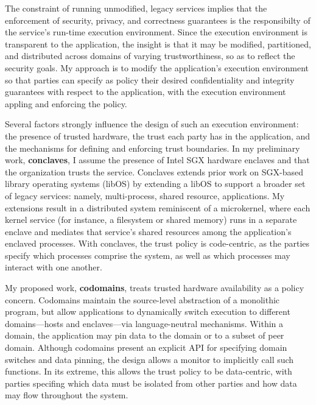 

%
The constraint of running unmodified, legacy services implies that the
enforcement of security, privacy, and correctness guarantees is the
responsibilty of the service's run-time execution environment. 
%
Since the execution environment is transparent to the application, the insight
is that it may be modified, partitioned, and distributed across domains of
varying trustworthiness, so as to reflect the security goals.
%
My approach is to modify the application's execution environment so that
parties can specify as policy their desired confidentiality and integrity
guarantees with respect to the application, with the execution environment
appling and enforcing the policy.


Several factors strongly influence the design of such an execution environment:
the presence of trusted hardware, the trust each party has in the application,
and the mechanisms for defining and enforcing trust boundaries.
%
In my preliminary work, \textbf{conclaves}, I assume the presence of Intel SGX hardware
enclaves and that the organization trusts the service.
%
Conclaves extends prior work on SGX-based library operating systems (libOS) by
extending a libOS to support a broader set of legacy services: namely,
multi-process, shared resource, applications.
%
My extensions result in a distributed system reminiscent of a microkernel,
where each kernel service (for instance, a filesystem or shared memory)
runs in a separate enclave and mediates that service’s shared resources
among the application's enclaved processes.
%
With conclaves, the trust policy is code-centric, as the parties specify which
processes comprise the system, as well as which processes may interact with one
another.


My proposed work, \textbf{codomains}, treats trusted hardware availability as a
policy concern.
%
Codomains maintain the source-level abstraction of a monolithic program, but
allow applications to dynamically switch execution to different domains—hosts
and enclaves—via language-neutral mechanisms.
%
Within a domain, the application may pin data to the domain or to a subset of
peer domain.
%
Although codomains present an explicit API for specifying domain switches and
data pinning, the design allows a monitor to implicitly call such functions.
%
In its extreme, this allows the trust policy to be data-centric, with parties
specifing which data must be isolated from other parties and how data may flow
throughout the system.


